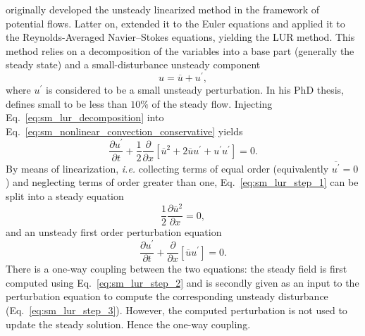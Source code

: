 
\citet{Verdon1984} originally developed the unsteady linearized 
method in the framework of potential flows. Latter on, \citet{Hall1989}
extended it to the Euler equations and
\citet{Clark2000} applied it to the Reynolds-Averaged Navier--Stokes equations,
yielding the LUR method.
This method relies on a decomposition of the variables
into a base part (generally the steady state) 
and a small-disturbance unsteady component
\begin{equation}
	u = \overline{u} + u^\prime,
	\label{eq:sm_lur_decomposition}
\end{equation}
where $u^\prime$ is considered to be a small unsteady perturbation.
In his PhD thesis,
\citet{Hall1987} defines small to be less than $10\%$ of the
steady flow.
Injecting Eq.~\eqref{eq:sm_lur_decomposition} into 
Eq.~\eqref{eq:sm_nonlinear_convection_conservative} yields
\begin{equation}
	\frac{\partial u^\prime}{\partial t} + 
	\frac{1}{2}\frac{\partial}{\partial x} \left[
	\overline{u}^2 + 2 \overline{u} u^\prime + u^\prime u^\prime \right] = 
	0.
	\label{eq:sm_lur_step_1}
\end{equation}
By means of linearization, \emph{i.e.} collecting terms
of equal order (equivalently $\overline{u^\prime} = 0$) 
and neglecting terms of order greater than one, 
Eq.~\eqref{eq:sm_lur_step_1} can be split
into a steady equation
\begin{equation}
	\frac{1}{2} \frac{\partial \overline{u}^2}{\partial x} = 0,
	\label{eq:sm_lur_step_2}
\end{equation}
and an unsteady first order perturbation equation
\begin{equation}
	\frac{\partial u^\prime}{\partial t} +
	\frac{\partial}{\partial x} \left[
	\overline{u} u^\prime \right] = 
	0.
	\label{eq:sm_lur_step_3}
\end{equation}
There is a one-way coupling between the two equations:
the steady field
is first computed using Eq.~\eqref{eq:sm_lur_step_2}
and is secondly given as an input to the
perturbation equation to compute
the corresponding unsteady disturbance (Eq.~\eqref{eq:sm_lur_step_3}). 
However, the computed
perturbation is not used to update the steady solution.
Hence the one-way coupling.

